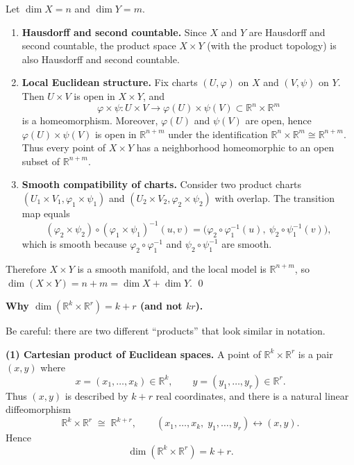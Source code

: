 \begin{solution}
Let $\dim X=n$ and $\dim Y=m$.

\begin{enumerate}
	\item \textbf{Hausdorff and second countable.}
	Since $X$ and $Y$ are Hausdorff and second countable, the product space
	$X\times Y$ (with the product topology) is also Hausdorff and second countable.
	
	\item \textbf{Local Euclidean structure.}
	Fix charts $(U,\varphi)$ on $X$ and $(V,\psi)$ on $Y$. Then $U\times V$ is open in
	$X\times Y$, and
	\[
	\varphi\times\psi:U\times V\longrightarrow \varphi(U)\times\psi(V)\subset \mathbb{R}^n\times\mathbb{R}^m
	\]
	is a homeomorphism. Moreover, $\varphi(U)$ and $\psi(V)$ are open, hence
	$\varphi(U)\times\psi(V)$ is open in $\mathbb{R}^{n+m}$ under the identification
	$\mathbb{R}^n\times\mathbb{R}^m\cong\mathbb{R}^{n+m}$.
	Thus every point of $X\times Y$ has a neighborhood homeomorphic to an open subset
	of $\mathbb{R}^{n+m}$.
	
	\item \textbf{Smooth compatibility of charts.}
	Consider two product charts $(U_1\times V_1,\varphi_1\times\psi_1)$ and
	$(U_2\times V_2,\varphi_2\times\psi_2)$ with overlap. The transition map equals
	\[
	(\varphi_2\times\psi_2)\circ(\varphi_1\times\psi_1)^{-1}(u,v)
	=\big(\varphi_2\circ\varphi_1^{-1}(u),\ \psi_2\circ\psi_1^{-1}(v)\big),
	\]
	which is smooth because $\varphi_2\circ\varphi_1^{-1}$ and $\psi_2\circ\psi_1^{-1}$
	are smooth.
\end{enumerate}

Therefore $X\times Y$ is a smooth manifold, and the local model is
$\mathbb{R}^{n+m}$, so $\dim(X\times Y)=n+m=\dim X+\dim Y$.
\qed

\par\medskip\noindent\textbf{Why $\dim(\mathbb{R}^k\times\mathbb{R}^r)=k+r$ (and not $kr$).}\par\smallskip

Be careful: there are two different ``products'' that look similar in notation.

\medskip
\noindent\textbf{(1) Cartesian product of Euclidean spaces.}
A point of $\mathbb{R}^k\times\mathbb{R}^r$ is a pair $(x,y)$ where
\[
x=(x_1,\dots,x_k)\in\mathbb{R}^k,\qquad y=(y_1,\dots,y_r)\in\mathbb{R}^r.
\]
Thus $(x,y)$ is described by $k+r$ real coordinates, and there is a natural
linear diffeomorphism
\[
\mathbb{R}^k\times\mathbb{R}^r \;\cong\; \mathbb{R}^{k+r},
\qquad
(x_1,\dots,x_k,\;y_1,\dots,y_r)\longleftrightarrow (x,y).
\]
Hence
\[
\dim(\mathbb{R}^k\times\mathbb{R}^r)=k+r.
\]


\end{solution}
